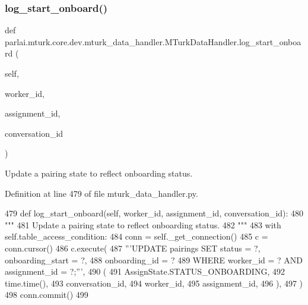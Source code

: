 \subsubsection{\texorpdfstring{log\+\_\+start\+\_\+onboard()}{log\_start\_onboard()}}
{\footnotesize\ttfamily def parlai.\+mturk.\+core.\+dev.\+mturk\+\_\+data\+\_\+handler.\+M\+Turk\+Data\+Handler.\+log\+\_\+start\+\_\+onboard (\begin{DoxyParamCaption}\item[{}]{self,  }\item[{}]{worker\+\_\+id,  }\item[{}]{assignment\+\_\+id,  }\item[{}]{conversation\+\_\+id }\end{DoxyParamCaption})}

\begin{DoxyVerb}Update a pairing state to reflect onboarding status.
\end{DoxyVerb}
 

Definition at line 479 of file mturk\+\_\+data\+\_\+handler.\+py.


\begin{DoxyCode}
479     \textcolor{keyword}{def }log\_start\_onboard(self, worker\_id, assignment\_id, conversation\_id):
480         \textcolor{stringliteral}{"""}
481 \textcolor{stringliteral}{        Update a pairing state to reflect onboarding status.}
482 \textcolor{stringliteral}{        """}
483         with self.table\_access\_condition:
484             conn = self.\_get\_connection()
485             c = conn.cursor()
486             c.execute(
487                 \textcolor{stringliteral}{'''UPDATE pairings SET status = ?, onboarding\_start = ?,}
488 \textcolor{stringliteral}{                         onboarding\_id = ?}
489 \textcolor{stringliteral}{                         WHERE worker\_id = ? AND assignment\_id = ?;'''},
490                 (
491                     AssignState.STATUS\_ONBOARDING,
492                     time.time(),
493                     conversation\_id,
494                     worker\_id,
495                     assignment\_id,
496                 ),
497             )
498             conn.commit()
499 
\end{DoxyCode}
\mbox{\label{classparlai_1_1mturk_1_1core_1_1dev_1_1mturk__data__handler_1_1MTurkDataHandler_ac8a4ba8bd6942424ff47149189c027a3}} 
